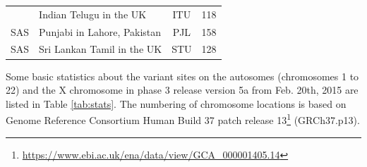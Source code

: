 \documentclass[]{book}
\let\rmarkdownfootnote\footnote%
\def\footnote{\protect\rmarkdownfootnote}
\renewcommand{\href}[2]{#2\footnote{\url{#1}}}
\begin{document}
\begin{longtable}[]{@{}clcc@{}}
\begin{minipage}[t]{0.14\columnwidth}
\end{minipage} & \begin{minipage}[t]{0.59\columnwidth}\raggedright\strut
Indian Telugu in the UK\strut
\end{minipage} & \begin{minipage}[t]{0.09\columnwidth}\centering\strut
ITU\strut
\end{minipage} & \begin{minipage}[t]{0.07\columnwidth}\centering\strut
118\strut
\end{minipage}\tabularnewline
\begin{minipage}[t]{0.14\columnwidth}\centering\strut
SAS\strut
\end{minipage} & \begin{minipage}[t]{0.59\columnwidth}\raggedright\strut
Punjabi in Lahore, Pakistan\strut
\end{minipage} & \begin{minipage}[t]{0.09\columnwidth}\centering\strut
PJL\strut
\end{minipage} & \begin{minipage}[t]{0.07\columnwidth}\centering\strut
158\strut
\end{minipage}\tabularnewline
\begin{minipage}[t]{0.14\columnwidth}\centering\strut
SAS\strut
\end{minipage} & \begin{minipage}[t]{0.59\columnwidth}\raggedright\strut
Sri Lankan Tamil in the UK\strut
\end{minipage} & \begin{minipage}[t]{0.09\columnwidth}\centering\strut
STU\strut
\end{minipage} & \begin{minipage}[t]{0.07\columnwidth}\centering\strut
128\strut
\end{minipage}\tabularnewline
\bottomrule
\end{longtable}

Some basic statistics about the variant sites on the autosomes
(chromosomes 1 to 22) and the X chromosome in phase 3 release version 5a
from Feb. 20th, 2015 are listed in Table \ref{tab:stats}. The numbering
of chromosome locations is based on
\href{https://www.ebi.ac.uk/ena/data/view/GCA_000001405.14}{Genome
Reference Consortium Human Build 37 patch release 13} (GRCh37.p13).
\end{document}
